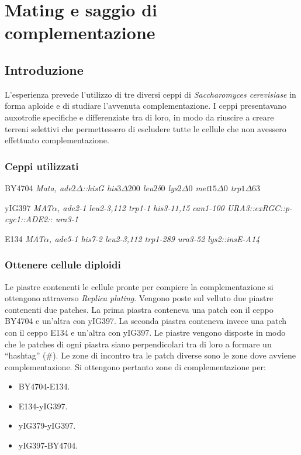 \section*{Mating e saggio di complementazione}

	\subsection*{Introduzione}
	L'esperienza prevede l'utilizzo di tre diversi ceppi di \emph{Saccharomyces cerevisiase} in forma aploide e di studiare l'avvenuta complementazione.
	I ceppi presentavano auxotrofie specifiche e differenziate tra di loro, in modo da riuscire a creare terreni selettivi che permettessero di escludere tutte le cellule che non avessero effettuato complementazione.
	
		\subsubsection*{Ceppi utilizzati}
		\begin{center}
			BY4704 \emph{Mata, ade$2\Delta$::hisG his$3\Delta200$ leu$2\delta 0$ lys$2\Delta0$ met$15\Delta0$ trp$1\Delta63$}
		\end{center}
		\begin{center}
			yIG397 \emph{MAT$\alpha$, ade2-1 leu2-3,112 trp1-1 his3-11,15 can1-100 URA3::exRGC::p-cyc1::ADE2:: ura3-1}
		\end{center}
		\begin{center}
			E134 \emph{MAT$\alpha$, ade5-1 his7-2 leu2-3,112 trp1-289 ura3-52 lys2::insE-A14}
		\end{center}

		\subsubsection*{Ottenere cellule diploidi}
		Le piastre contenenti le cellule pronte per compiere la complementazione si ottengono attraverso \emph{Replica plating}.
		Vengono poste sul velluto due piastre contenenti due patches.
		La prima piastra conteneva una patch con il ceppo BY4704 e un'altra con yIG397.
		La seconda piastra conteneva invece una patch con il ceppo E134 e un'altra con yIG397.
		Le piastre vengono disposte in modo che le patches di ogni piastra siano perpendicolari tra di loro a formare un ``hashtag'' ($\#$).
		Le zone di incontro tra le patch diverse sono le zone dove avviene complementazione.
		Si ottengono pertanto zone di complementazione per:
		\begin{multicols}{2}
			\begin{itemize}
				\item BY4704-E134.
				\item E134-yIG397.
				\item yIG379-yIG397.
				\item yIG397-BY4704.
			\end{itemize}
		\end{multicols}

